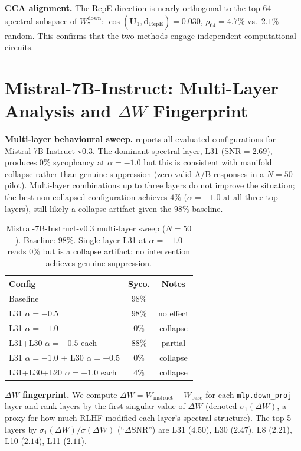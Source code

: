 \documentclass{article}
\newcommand{\snr}{\mathrm{SNR}}
\begin{document}
\textbf{CCA alignment.} The RepE direction is nearly orthogonal to the
top-64 spectral subspace of $W_7^\mathrm{down}$: $\cos(\mathbf{U}_1,
\hat{\mathbf{d}}_\mathrm{RepE}) {=} 0.030$, $\rho_{64}{=}4.7\%$ vs.\
$2.1\%$ random. This confirms that the two methods engage independent
computational circuits.

\section{Mistral-7B-Instruct: Multi-Layer Analysis and $\Delta W$ Fingerprint}
\label{app:mistral_multilayer}

\textbf{Multi-layer behavioural sweep.}
 reports all evaluated configurations for
Mistral-7B-Instruct-v0.3. The dominant spectral layer, L31 ($\snr{=}2.69$),
produces $0\%$ sycophancy at $\alpha{=}{-}1.0$ but this is consistent
with manifold collapse rather than genuine suppression (zero valid
A/B responses in a $N{=}50$ pilot). Multi-layer combinations up to
three layers do not improve the situation; the best non-collapsed
configuration achieves $4\%$ ($\alpha{=}{-}1.0$ at all three top layers),
still likely a collapse artifact given the $98\%$ baseline.

\begin{table}[h]
\centering\small
\caption{Mistral-7B-Instruct-v0.3 multi-layer sweep ($N{=}50$).
Baseline: $98\%$. Single-layer L31 at $\alpha{=}{-}1.0$ reads $0\%$ but
is a collapse artifact; no intervention achieves genuine suppression.}
\label{tab:mistral_multilayer}
\begin{tabular}{lcc}
\toprule
Config & Syco. & Notes \\
\midrule
Baseline & 98\% & \\
L31 $\alpha{=}{-}0.5$ & 98\% & no effect \\
L31 $\alpha{=}{-}1.0$ & 0\% & collapse \\
L31+L30 $\alpha{=}{-}0.5$ each & 88\% & partial \\
L31 $\alpha{=}{-}1.0$ + L30 $\alpha{=}{-}0.5$ & 0\% & collapse \\
L31+L30+L20 $\alpha{=}{-}1.0$ each & 4\% & collapse \\
\bottomrule
\end{tabular}
\end{table}

\textbf{$\Delta W$ fingerprint.}
We compute $\Delta W = W_\mathrm{instruct} - W_\mathrm{base}$ for each
\texttt{mlp.down\_proj} layer and rank layers by the first singular value
of $\Delta W$ (denoted $\sigma_1(\Delta W)$, a proxy for how much RLHF
modified each layer's spectral structure). The top-5 layers by
$\sigma_1(\Delta W) / \tilde{\sigma}(\Delta W)$ (``$\Delta$SNR'') are
L31 ($4.50$), L30 ($2.47$), L8 ($2.21$), L10 ($2.14$), L11 ($2.11$).
\end{document}
